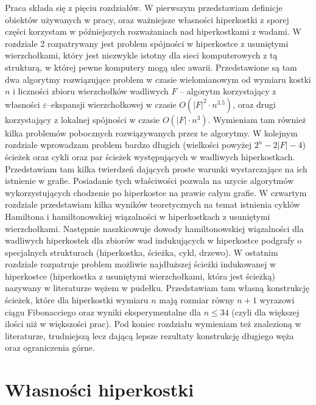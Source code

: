 \documentclass{pracamgr}
\begin{document}
  Praca składa się z pięciu rozdziałów. W pierwszym przedstawiam definicje obiektów używanych w pracy, oraz ważniejsze własności
  hiperkostki z sporej części korzystam w późniejszych rozważaniach nad hiperkostkami z wadami.\newline
  W rozdziale 2 rozpatrywany jest problem spójności w hiperkostce z usuniętymi wierzchołkami, który jest niezwykle istotny dla sieci komputerowych
  z tą strukturą, w której pewne komputery mogą ulec awarii. Przedstawione są tam dwa algorytmy rozwiązujące problem w czasie wielomianowym od wymiaru kostki $n$
  i liczności zbioru wierzchołków wadliwych $F$ -- algorytm korzystający z własności $\varepsilon$--ekspansji wierzchołkowej w czasie $O(|F|^2\cdot n^{3.5})$,
  oraz drugi korzystający z lokalnej spójności w czasie $O(|F|\cdot n^3)$. Wymieniam tam również kilka problemów pobocznych rozwiązywanych przez te algorytmy.\newline
  W kolejnym rozdziale wprowadzam problem bardzo długich (wielkości powyżej $2^n-2|F|-4$) ścieżek oraz cykli oraz par ścieżek występujących w wadliwych hiperkostkach.
  Przedstawiam tam kilka twierdzeń dających proste warunki wystarczające na ich istnienie w grafie. 
  Posiadanie tych właściwości pozwala na uzycie algorytmów wykorzystujących chodzenie po hiperkostce na prawie całym grafie.\newline
  W czwartym rozdziale przedstawiam kilka wyników teoretycznych na temat istnienia cyklów Hamiltona i hamiltonowskiej wiązalności w hiperkostkach z usuniętymi
  wierzchołkami. Następnie naszkicowuje dowody hamiltonowskiej wiązalności dla wadliwych hiperkostek dla zbiorów wad indukujących w hiperkostce
  podgrafy o specjalnych strukturach (hiperkostka, ścieżka, cykl, drzewo).\newline
  W ostatnim rozdziale rozpatruje problem możliwie najdłuższej ścieżki indukowanej w hiperkostce (hiperkostka z usuniętymi wierzchołkami, która jest ścieżką)
  nazywany w literaturze wężem w pudełku. Przedstawiam tam własną konstrukcję ścieżek, które dla hiperkostki wymiaru $n$ mają rozmiar równy $n+1$
  wyrazowi ciągu Fibonacciego oraz wyniki eksperymentalne dla $n\le34$ (czyli dla większej ilości niż w większości prac).
  Pod koniec rozdziału wymieniam też znalezioną w literaturze, trudniejszą lecz dającą lepsze rezultaty konstrukcję długiego węża oraz 
  ograniczenia górne.

  
  
 \chapter{Własności hiperkostki}
\end{document}
